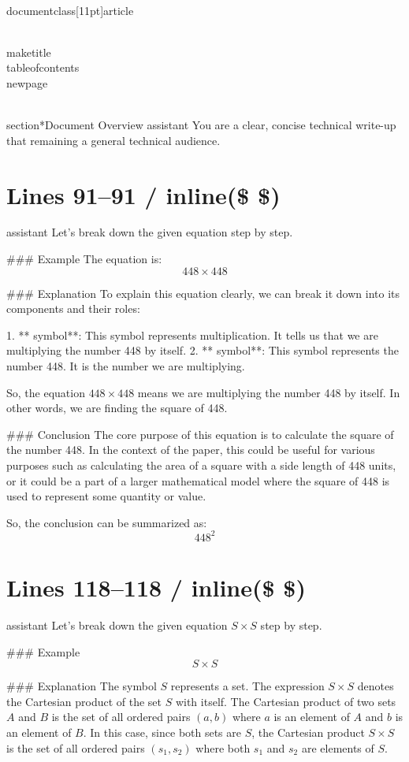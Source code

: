 \\documentclass[11pt]{article}
\begin{document}
\\maketitle
\\tableofcontents
\\newpage

\\section*{Document Overview}
assistant
You are a clear, concise technical write-up that remaining a general technical audience.

\newpage

\section*{Lines 91–91 / inline(\$ \$) }
assistant
Let's break down the given equation step by step.

### Example
The equation is:
\[ 448 \times 448 \]

### Explanation
To explain this equation clearly, we can break it down into its components and their roles:

1. ** symbol**: This symbol represents multiplication. It tells us that we are multiplying the number 448 by itself.
2. ** symbol**: This symbol represents the number 448. It is the number we are multiplying.

So, the equation \( 448 \times 448 \) means we are multiplying the number 448 by itself. In other words, we are finding the square of 448.

### Conclusion
The core purpose of this equation is to calculate the square of the number 448. In the context of the paper, this could be useful for various purposes such as calculating the area of a square with a side length of 448 units, or it could be a part of a larger mathematical model where the square of 448 is used to represent some quantity or value.

So, the conclusion can be summarized as:
\[ \boxed{448^2} \]


\section*{Lines 118–118 / inline(\$ \$) }
assistant
Let's break down the given equation \( S \times S \) step by step.

### Example
\[ S \times S \]

### Explanation
The symbol \( S \) represents a set. The expression \( S \times S \) denotes the Cartesian product of the set \( S \) with itself. The Cartesian product of two sets \( A \) and \( B \) is the set of all ordered pairs \((a, b)\) where \( a \) is an element of \( A \) and \( b \) is an element of \( B \). In this case, since both sets are \( S \), the Cartesian product \( S \times S \) is the set of all ordered pairs \((s_1, s_2)\) where both \( s_1 \) and \( s_2 \) are elements of \( S \).
\end{document}

